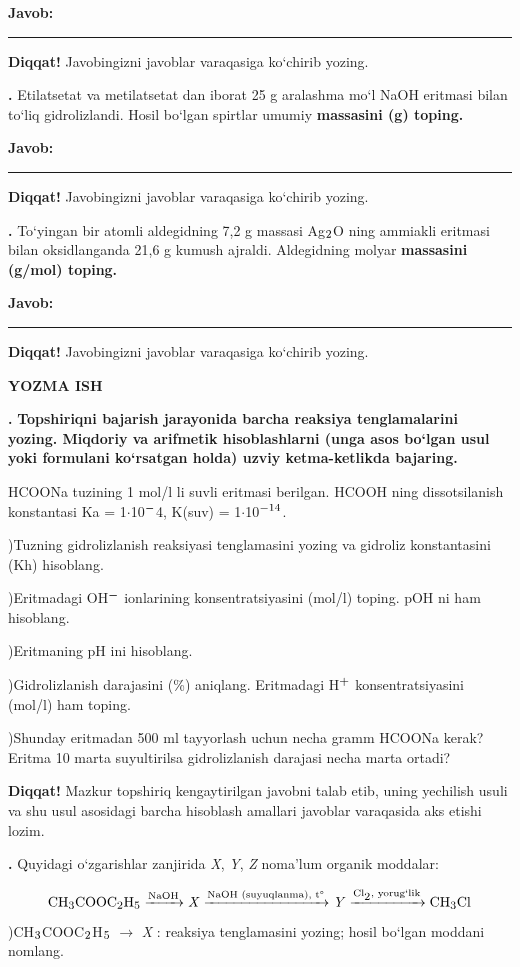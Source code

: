 \documentclass[11pt,a4paper]{article}
\renewcommand{\textsubscript}[1]{\ensuremath{_{\text{\fontsize{8}{8}\selectfont #1}}}}
\renewcommand{\textsuperscript}[1]{\ensuremath{^{\text{\fontsize{8}{8}\selectfont #1}}}}
\newcommand{\qn}[1]{\textbf{\fontsize{11.5}{13}\selectfont #1}}
\newcommand{\qsep}{\par\vspace{1pt}\noindent\rule{0pt}{0.4pt}\par\vspace{5pt}}
\newcommand{\diqqat}[1]{\par\smallskip\noindent\textbf{Diqqat!} #1\par\medskip}
\newcommand{\javob}{\par\smallskip\noindent\textbf{Javob:} \rule[-2pt]{7.5cm}{0.4pt}\par\smallskip\noindent\textbf{Diqqat!} Javobingizni javoblar varaqasiga ko`chirib yozing.\par\medskip}
\begin{document}
\javob\qsep
\noindent\qn{39.} Etilatsetat va metilatsetat dan iborat 25 g aralashma mo`l NaOH eritmasi bilan to`liq gidrolizlandi. Hosil bo`lgan spirtlar umumiy \textbf{massasini (g) toping.}
\javob\qsep
\noindent\qn{40.} To`yingan bir atomli aldegidning 7,2 g massasi Ag\textsubscript{2}O ning ammiakli eritmasi bilan oksidlanganda 21,6 g kumush ajraldi. Aldegidning molyar \textbf{massasini (g/mol) toping.}
\javob\qsep
\par\bigskip\begin{center}\textbf{\fontsize{13}{15}\selectfont YOZMA ISH}\end{center}
\noindent\qn{41.} \textbf{Topshiriqni bajarish jarayonida barcha reaksiya tenglamalarini yozing. Miqdoriy va arifmetik hisoblashlarni (unga asos bo`lgan usul yoki formulani ko`rsatgan holda) uzviy ketma-ketlikda bajaring.}\par\smallskip
HCOONa tuzining 1 mol/l li suvli eritmasi berilgan. HCOOH ning dissotsilanish konstantasi Ka = 1$\cdot$10\textsuperscript{$-$}4, K(suv) = 1$\cdot$10\textsuperscript{$-$14}.\par
{})Tuzning gidrolizlanish reaksiyasi tenglamasini yozing va gidroliz konstantasini (Kh) hisoblang.\par
{})Eritmadagi OH\textsuperscript{$-$} ionlarining konsentratsiyasini (mol/l) toping. pOH ni ham hisoblang.\par
{})Eritmaning pH ini hisoblang.\par
{})Gidrolizlanish darajasini (\%) aniqlang. Eritmadagi H\textsuperscript{+} konsentratsiyasini (mol/l) ham toping.\par
{})Shunday eritmadan 500 ml tayyorlash uchun necha gramm HCOONa kerak? Eritma 10 marta suyultirilsa gidrolizlanish darajasi necha marta ortadi?\par
\diqqat{Mazkur topshiriq kengaytirilgan javobni talab etib, uning yechilish usuli va shu usul asosidagi barcha hisoblash amallari javoblar varaqasida aks etishi lozim.}\qsep
\noindent\qn{42.} Quyidagi o`zgarishlar zanjirida \textit{X}, \textit{Y}, \textit{Z} noma'lum organik moddalar:\par
\[\setlength{\fboxsep}{0pt}\text{CH\textsubscript{3}COOC\textsubscript{2}H\textsubscript{5}}\xrightarrow{\text{NaOH}}\text{\textit{X}}\xrightarrow{\text{NaOH (suyuqlanma), t\textdegree{}}}\text{\textit{Y}}\xrightarrow{\text{Cl\textsubscript{2}, yorug`lik}}\text{CH\textsubscript{3}Cl}\]
)CH\textsubscript{3}COOC\textsubscript{2}H\textsubscript{5} $\to$ \textit{X} : reaksiya tenglamasini yozing; hosil bo`lgan moddani nomlang.\par
\end{document}
